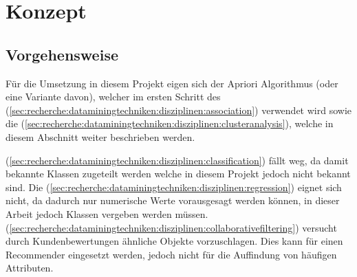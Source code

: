 
\chapter{Konzept}
\label{sec:konzept}

\section{Vorgehensweise}
\label{sec:konzept:vorgehensweise}
Für die Umsetzung in diesem Projekt eigen sich der Apriori Algorithmus (oder eine Variante davon), welcher im ersten Schritt des  (\cref{sec:recherche:dataminingtechniken:disziplinen:association}) verwendet wird sowie die  (\cref{sec:recherche:dataminingtechniken:disziplinen:clusteranalysis}), welche in diesem Abschnitt weiter beschrieben werden.

 (\cref{sec:recherche:dataminingtechniken:disziplinen:classification}) fällt weg, da damit bekannte Klassen zugeteilt werden welche in diesem Projekt jedoch nicht bekannt sind. Die  (\cref{sec:recherche:dataminingtechniken:disziplinen:regression}) eignet sich nicht, da dadurch nur numerische Werte vorausgesagt werden können, in dieser Arbeit jedoch Klassen vergeben werden müssen.  (\cref{sec:recherche:dataminingtechniken:disziplinen:collaborativefiltering}) versucht durch Kundenbewertungen ähnliche Objekte vorzuschlagen. Dies kann für einen Recommender eingesetzt werden, jedoch nicht für die Auffindung von häufigen Attributen.

